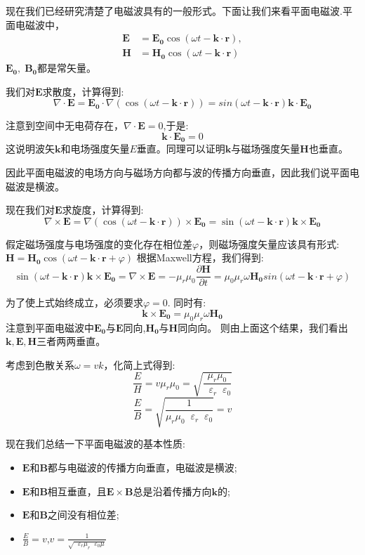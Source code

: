 \documentclass[12pt,a4paper,oneside]{report}
\theoremstyle{definition}
\theoremstyle{remark}
\newcommand{\mb}[1]{\mathbf{#1}}
\renewcommand{\v}{\mathop{}\!\varepsilon}
\begin{document}
现在我们已经研究清楚了电磁波具有的一般形式。下面让我们来看平面电磁波.平面电磁波中，
\begin{align*}
\mb{E} &= \mb{E_0} \cos(\omega t - \mathbf k \cdot \mathbf r), \\[4pt]
\mb{H} &= \mb{H_0} \cos(\omega t - \mathbf k \cdot \mathbf r)
\end{align*}
$\mb{E_0},\; \mb{B_0}$都是常矢量。

我们对$\mb{E}$求散度，计算得到:
\[
\nabla \cdot \mb{E} = \mb{E_0} \cdot \nabla(\cos(\omega t -\mb{k}\cdot \mb{r})) = sin(\omega t- \mb{k}\cdot \mb{r})\mb{k}\cdot \mb{E_0}
\]

注意到空间中无电荷存在，$\nabla \cdot \mb{E}=0$,于是:
\[
\mb{k}\cdot \mb{E_0} = 0
\]
这说明波矢$\mb{k}$和电场强度矢量$E$垂直。同理可以证明$\mb{k}$与磁场强度矢量$\mb{H}$也垂直。

因此平面电磁波的电场方向与磁场方向都与波的传播方向垂直，因此我们说平面电磁波是横波。

现在我们对$\mb{E}$求旋度，计算得到:
\[
\nabla\times\mb{E} =  \nabla(\cos(\omega t -\mb{k}\cdot \mb{r}))\times \mb{E_0} = \sin(\omega t- \mb{k}\cdot \mb{r})\mb{k}\times \mb{E_0}
\]

假定磁场强度与电场强度的变化存在相位差$\varphi$，则磁场强度矢量应该具有形式:$\mb{H} = \mb{H_0} \cos(\omega t - \mathbf k \cdot \mathbf r+\varphi)$ 根据Maxwell方程，我们得到:
\[
\sin(\omega t- \mb{k}\cdot \mb{r})\mb{k}\times \mb{E_0}= \nabla \times \mb{E} = -\mu_r\mu_0\frac{\partial\mathbf{H}}{\partial t} = \mu_0 \mu_r \omega \mb{H_0}sin(\omega t- \mb{k}\cdot \mb{r}+\varphi)
\]

为了使上式始终成立，必须要求$\varphi = 0$. 同时有:
\[
\mb{k} \times \mb{E_0} = \mu_0\mu_r \omega \mb{H_0} 
\]
注意到平面电磁波中$\mb{E_0}$与$\mb{E}$同向,$\mb{H_0}$与$\mb{H}$同向向。
则由上面这个结果，我们看出$\mb{k},\mb{E},\mb{H}$三者两两垂直。

考虑到色散关系$\omega = vk$，化简上式得到:
\[
\frac{E}{H} = v\mu_r\mu_0 = \sqrt{\frac{\mu_r\mu_0}{\v_r\v_0}}
\]
\[
\frac{E}{B} =  \sqrt{\frac{1}{\mu_r\mu_0\v_r\v_0}} = v
\]

现在我们总结一下平面电磁波的基本性质:
\begin{itemize}
  \item $\mb{E}$和$\mb{B}$都与电磁波的传播方向垂直，电磁波是横波;
  \item $\mb{E}$和$\mb{B}$相互垂直，且$\mb{E}\times\mb{B}$总是沿着传播方向$\mb{k}$的;
  \item $\mb{E}$和$\mb{B}$之间没有相位差;
  \item $\frac{E}{B}=v$,$v=\frac{1}{\sqrt{\v_r\mu_r\v_0\mu}}$
\end{itemize}
\end{document}
